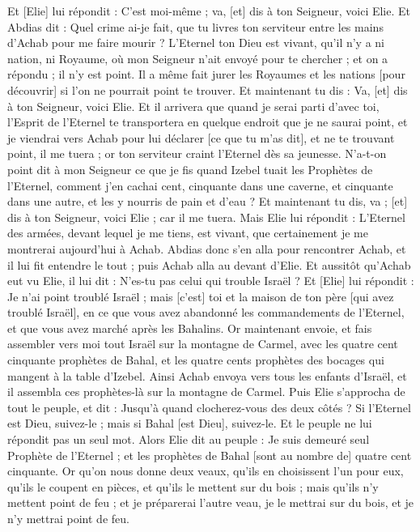 \begin{multicols}{2}
Et [Elie] lui répondit : C'est moi-même ; va, [et] dis à ton Seigneur, voici Elie.
Et Abdias dit : Quel crime ai-je fait, que tu livres ton serviteur entre les mains d'Achab pour me faire mourir ?
L'Eternel ton Dieu est vivant, qu'il n'y a ni nation, ni Royaume, où mon Seigneur n'ait envoyé pour te chercher ; et on a répondu ; il n'y est point. Il a même fait jurer les Royaumes et les nations [pour découvrir] si l'on ne pourrait point te trouver.
Et maintenant tu dis : Va, [et] dis à ton Seigneur, voici Elie.
Et il arrivera que quand je serai parti d'avec toi, l'Esprit de l'Eternel te transportera en quelque endroit que je ne saurai point, et je viendrai vers Achab pour lui déclarer [ce que tu m'as dit], et ne te trouvant point, il me tuera ; or ton serviteur craint l'Eternel dès sa jeunesse.
N'a-t-on point dit à mon Seigneur ce que je fis quand Izebel tuait les Prophètes de l'Eternel, comment j'en cachai cent, cinquante dans une caverne, et cinquante dans une autre, et les y nourris de pain et d'eau ?
Et maintenant tu dis, va ; [et] dis à ton Seigneur, voici Elie ; car il me tuera.
Mais Elie lui répondit : L'Eternel des armées, devant lequel je me tiens, est vivant, que certainement je me montrerai aujourd'hui à Achab.
Abdias donc s'en alla pour rencontrer Achab, et il lui fit entendre le tout ; puis Achab alla au devant d'Elie.
Et aussitôt qu'Achab eut vu Elie, il lui dit : N'es-tu pas celui qui trouble Israël ?
Et [Elie] lui répondit : Je n'ai point troublé Israël ; mais [c'est] toi et la maison de ton père [qui avez troublé Israël], en ce que vous avez abandonné les commandements de l'Eternel, et que vous avez marché après les Bahalins.
Or maintenant envoie, et fais assembler vers moi tout Israël sur la montagne de Carmel, avec les quatre cent cinquante prophètes de Bahal, et les quatre cents prophètes des bocages qui mangent à la table d'Izebel.
Ainsi Achab envoya vers tous les enfants d'Israël, et il assembla ces prophètes-là sur la montagne de Carmel.
Puis Elie s'approcha de tout le peuple, et dit : Jusqu'à quand clocherez-vous des deux côtés ? Si l'Eternel est Dieu, suivez-le ; mais si Bahal [est Dieu], suivez-le. Et le peuple ne lui répondit pas un seul mot.
Alors Elie dit au peuple : Je suis demeuré seul Prophète de l'Eternel ; et les prophètes de Bahal [sont au nombre de] quatre cent cinquante.
Or qu'on nous donne deux veaux, qu'ils en choisissent l'un pour eux, qu'ils le coupent en pièces, et qu'ils le mettent sur du bois ; mais qu'ils n'y mettent point de feu ; et je préparerai l'autre veau, je le mettrai sur du bois, et je n'y mettrai point de feu.

\end{multicols}
